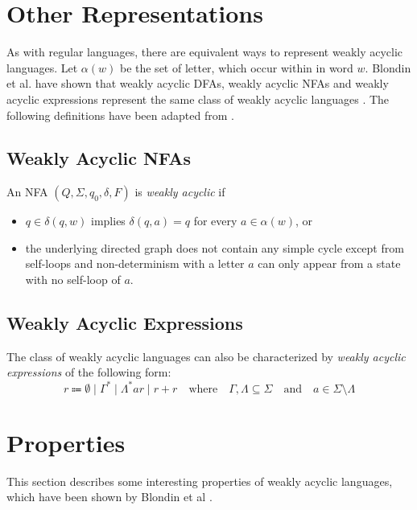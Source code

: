 \section{Other Representations}

As with regular languages, there are equivalent ways to represent weakly acyclic languages. Let $\alpha(w)$ be the set of letter, which occur within in word $w$. 
Blondin et al. have shown that weakly acyclic DFAs, weakly acyclic NFAs and weakly acyclic expressions represent the same class of weakly acyclic languages \cite{blondin_24}. The following definitions have been adapted from \cite{blondin_24}.



\subsection{Weakly Acyclic NFAs}
An NFA $(Q, \Sigma, q_{0},\delta,F)$ is \textit{weakly acyclic} if 
\begin{itemize}[--,noitemsep]
	\item $q \in \delta(q,w)$ implies $\delta(q,a) = {q}$ for every $a \in \alpha(w)$, or
	\item the underlying directed graph does not contain any simple cycle except from self-loops and non-determinism with a letter $a$ can only appear from a state with no self-loop of $a$.
\end{itemize}

\subsection{Weakly Acyclic Expressions}\label{sec:weakly_acyclic_regex}
The class of weakly acyclic languages can also be characterized by \textit{weakly acyclic expressions} of the following form:
\begin{equation*}
r \Coloneqq \emptyset \mid \Gamma^{*} \mid \Lambda^{*} a r \mid r + r \quad \text{where} \quad  \Gamma, \Lambda \subseteq \Sigma \quad \textrm{and} \quad a \in \Sigma \setminus \Lambda
\end{equation*}


\section{Properties}
This section describes some interesting properties of weakly acyclic languages, which have been shown by Blondin et al \cite{blondin_24}. 
